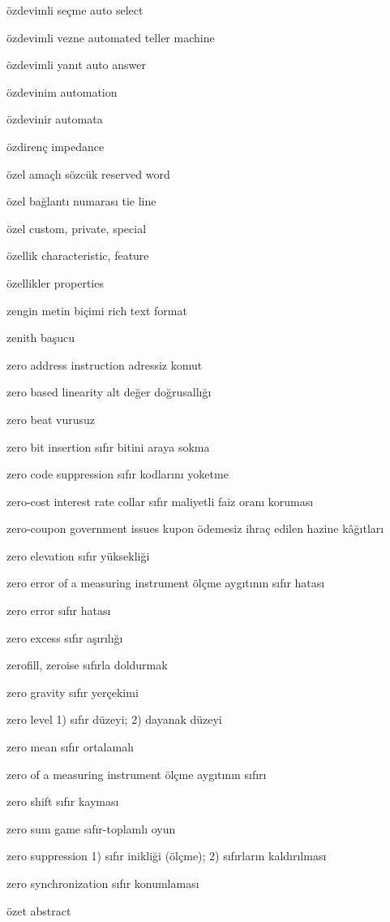 \documentclass[12pt,fleqn]{article}\usepackage{../../common}
\begin{document}
özdevimli seçme auto select

özdevimli vezne automated teller machine

özdevimli yanıt auto answer

özdevinim automation

özdevinir automata

özdirenç impedance

özel amaçlı sözcük reserved word

özel bağlantı numarası tie line

özel custom, private, special

özellik characteristic, feature

özellikler properties

zengin metin biçimi rich text format

zenith başucu

zero address instruction adressiz komut

zero based linearity alt değer doğrusallığı

zero beat vurusuz

zero bit insertion sıfır bitini araya sokma

zero code suppression sıfır kodlarını yoketme

zero-cost interest rate collar sıfır maliyetli faiz oranı koruması

zero-coupon government issues kupon ödemesiz ihraç edilen hazine kâğıtları

zero elevation sıfır yüksekliği

zero error of a measuring instrument ölçme aygıtının sıfır hatası

zero error sıfır hatası

zero excess sıfır aşırılığı

zerofill, zeroise sıfırla doldurmak

zero gravity sıfır yerçekimi

zero level 1) sıfır düzeyi; 2) dayanak düzeyi

zero mean sıfır ortalamalı

zero of a measuring instrument ölçme aygıtının sıfırı

zero shift sıfır kayması

zero sum game sıfır-toplamlı oyun

zero suppression 1) sıfır inikliği (ölçme); 2) sıfırların kaldırılması

zero synchronization sıfır konumlaması

özet abstract
\end{document}
